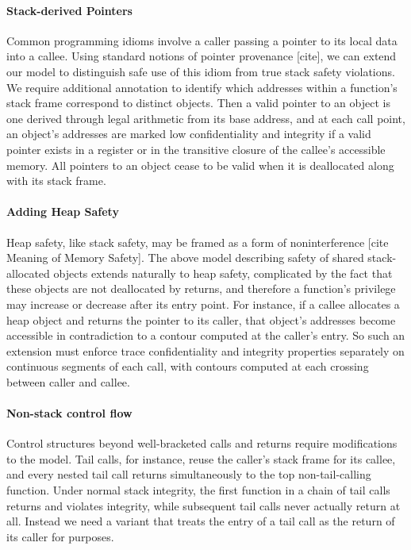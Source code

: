 \documentclass[acmsmall,review,anonymous]{acmart}\settopmatter{printfolios=true,printccs=false,printacmref=false}
\begin{document}
  \paragraph{Stack-derived Pointers}
    
    Common programming idioms involve a caller passing a pointer to its local
    data into a callee. Using standard notions of pointer provenance [cite],
    we can extend our model to distinguish safe use of this idiom from true
    stack safety violations. We require additional annotation to identify
    which addresses within a function's stack frame correspond to distinct
    objects. Then a valid pointer to an object is one derived through legal
    arithmetic from its base address, and at each call point, an object's
    addresses are marked low confidentiality and integrity if a valid pointer
    exists in a register or in the transitive closure of the callee's
    accessible memory. All pointers to an object cease to be valid when it is
    deallocated along with its stack frame.

  \paragraph{Adding Heap Safety}

    Heap safety, like stack safety, may be framed as a form of noninterference
    [cite Meaning of Memory Safety]. The above model describing safety of
    shared stack-allocated objects extends naturally to heap safety,
    complicated by the fact that these objects are not deallocated by returns,
    and therefore a function's privilege may increase or decrease after its
    entry point. For instance, if a callee allocates a heap object and returns
    the pointer to its caller, that object's addresses become accessible in
    contradiction to a contour computed at the caller's entry. So such an
    extension must enforce trace confidentiality and integrity properties
    separately on continuous segments of each call, with contours computed at
    each crossing between caller and callee.

  \paragraph{Non-stack control flow}

    Control structures beyond well-bracketed calls and returns require
    modifications to the model. Tail calls, for instance, reuse the caller's
    stack frame for its callee, and every nested tail call returns
    simultaneously to the top non-tail-calling function. Under normal stack
    integrity, the first function in a chain of tail calls returns and violates
    integrity, while subsequent tail calls never actually return at all.
    Instead we need a variant that treats the entry of a tail call as the
    return of its caller for purposes.
\end{document}

